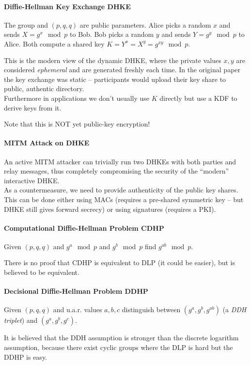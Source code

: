 \paragraph{Diffie-Hellman Key Exchange DHKE}
The group and $(p, q, q)$ are public parameters.
Alice picks a random $x$ and sends $X = g^x \mod p$ to Bob.
Bob picks a random $y$ and sends $Y = g^y \mod p$ to Alice.
Both compute a shared key $K = Y^x = X^y = g^{xy} \mod p$.

This is the modern view of the dynamic DHKE, where the private values $x, y$ are considered \emph{ephemeral} and are generated freshly each time.
In the original paper the key exchange was static -- participants would upload their key share to public, authentic directory.
\\
Furthermore in applications we don't usually use $K$ directly but use a KDF to derive keys from it.

Note that this is NOT yet public-key encryption!

\paragraph{MITM Attack on DHKE}
An active MITM attacker can trivially run two DHKEs with both parties and relay messages,
thus completely compromising the security of the ``modern'' interactive DHKE.
\\
As a countermeasure, we need to provide authenticity of the public key shares.
This can be done either using MACs (requires a pre-shared symmetric key -- but DHKE still gives forward secrecy)
or using signatures (requires a PKI).

\paragraph{Computational Diffie-Hellman Problem CDHP}
Given $(p, q, q)$ and $g^a \mod p$ and $g^b \mod p$ find $g^{ab} \mod p$.

There is no proof that CDHP is equivalent to DLP (it could be easier), but is believed to be equivalent.

\paragraph{Decisional Diffie-Hellman Problem DDHP}
Given $(p, q, q)$ and u.a.r. values $a, b, c$ distinguish between
$(g^a, g^b, g^{ab})$ (a \emph{DDH triplet}) and $(g^a, g^b, g^c)$.

It is believed that the DDH assumption is stronger than the discrete logarithm assumption,
because there exist cyclic groups where the DLP is hard but the DDHP is easy.
 

